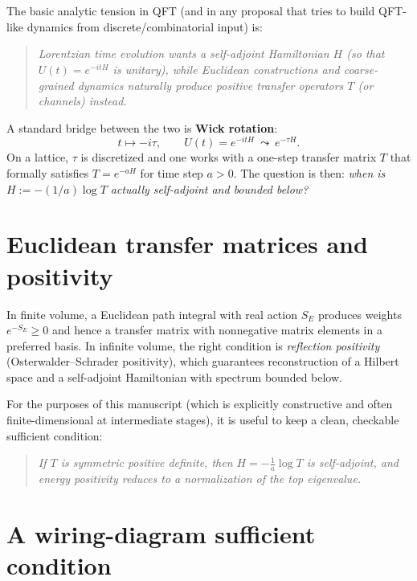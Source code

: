\documentclass[11pt,oneside]{amsbook}
\numberwithin{equation}{section}
\theoremstyle{plain}
\theoremstyle{definition}
\theoremstyle{remark}
\begin{document}
\section*{}

The basic analytic tension in QFT (and in any proposal that tries to build QFT-like dynamics from discrete/combinatorial input) is:

\begin{quote}
\emph{Lorentzian time evolution wants a self-adjoint Hamiltonian $H$ (so that $U(t)=e^{-itH}$ is unitary), while Euclidean constructions and coarse-grained dynamics naturally produce \emph{positive} transfer operators $T$ (or channels) instead.}
\end{quote}

A standard bridge between the two is \textbf{Wick rotation}:
\[
t\mapsto -i\tau,\qquad U(t)=e^{-itH}\ \leadsto\ e^{-\tau H}.
\]
On a lattice, $\tau$ is discretized and one works with a one-step transfer matrix $T$ that formally satisfies $T=e^{-aH}$ for time step $a>0$.
The question is then: \emph{when is $H:=-(1/a)\log T$ actually self-adjoint and bounded below?}

\section{Euclidean transfer matrices and positivity}

In finite volume, a Euclidean path integral with real action $S_E$ produces weights $e^{-S_E}\ge 0$ and hence a transfer matrix with nonnegative matrix elements in a preferred basis.
In infinite volume, the right condition is \emph{reflection positivity} (Osterwalder--Schrader positivity), which guarantees reconstruction of a Hilbert space and a self-adjoint Hamiltonian with spectrum bounded below.

For the purposes of this manuscript (which is explicitly constructive and often finite-dimensional at intermediate stages), it is useful to keep a clean, checkable sufficient condition:

\begin{quote}
\emph{If $T$ is symmetric positive definite, then $H=-\frac{1}{a}\log T$ is self-adjoint, and energy positivity reduces to a normalization of the top eigenvalue.}
\end{quote}

\section{A wiring-diagram sufficient condition}
\end{document}
